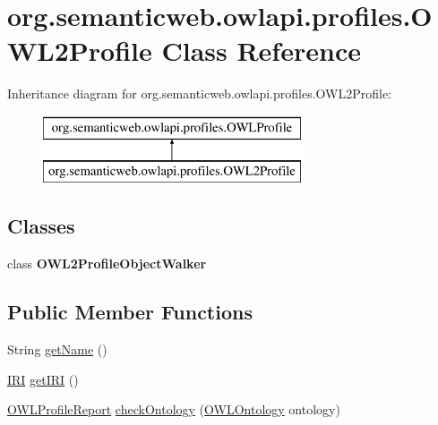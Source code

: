 \hypertarget{classorg_1_1semanticweb_1_1owlapi_1_1profiles_1_1_o_w_l2_profile}{\section{org.\-semanticweb.\-owlapi.\-profiles.\-O\-W\-L2\-Profile Class Reference}
\label{classorg_1_1semanticweb_1_1owlapi_1_1profiles_1_1_o_w_l2_profile}
}
Inheritance diagram for org.\-semanticweb.\-owlapi.\-profiles.\-O\-W\-L2\-Profile\-:\begin{figure}[H]
\begin{center}
\leavevmode
\includegraphics[height=2.000000cm]{classorg_1_1semanticweb_1_1owlapi_1_1profiles_1_1_o_w_l2_profile}
\end{center}
\end{figure}
\subsection*{Classes}
\begin{DoxyCompactItemize}
\item 
class {\bfseries O\-W\-L2\-Profile\-Object\-Walker}
\end{DoxyCompactItemize}
\subsection*{Public Member Functions}
\begin{DoxyCompactItemize}
\item 
String \hyperlink{classorg_1_1semanticweb_1_1owlapi_1_1profiles_1_1_o_w_l2_profile_a03006ba95eae625257325619a116a61a}{get\-Name} ()
\item 
\hyperlink{classorg_1_1semanticweb_1_1owlapi_1_1model_1_1_i_r_i}{I\-R\-I} \hyperlink{classorg_1_1semanticweb_1_1owlapi_1_1profiles_1_1_o_w_l2_profile_aa999e2d2768928f9e1e5b9d1527d0234}{get\-I\-R\-I} ()
\item 
\hyperlink{classorg_1_1semanticweb_1_1owlapi_1_1profiles_1_1_o_w_l_profile_report}{O\-W\-L\-Profile\-Report} \hyperlink{classorg_1_1semanticweb_1_1owlapi_1_1profiles_1_1_o_w_l2_profile_ac16f19ef731d8580975ac038a43168d5}{check\-Ontology} (\hyperlink{interfaceorg_1_1semanticweb_1_1owlapi_1_1model_1_1_o_w_l_ontology}{O\-W\-L\-Ontology} ontology)
\end{DoxyCompactItemize}
